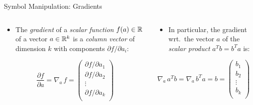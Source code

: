 \documentclass[mathserif, aspectratio=169]{beamer}
\begin{document}
\begin{frame}{Symbol Manipulation: Gradients}
	\begin{columns}[t]
		\begin{column}{0.5\textwidth}
			\begin{itemize}
				\item The \emph{gradient} of a \emph{scalar function} $f(a) \in \mathbb{R}$ of a vector $a \in \mathbb{R}^k$ is
					a \emph{column vector} of dimension $k$ with components ${\partial f}/{\partial a_i}$: 
			\end{itemize}
			\vspace{-5mm}
			\begin{center}
				\[ 
					\frac{\partial f}{\partial a} = \nabla_a\, f =
					\begin{pmatrix}
						{\partial f}/{\partial a_1} \\ 
						{\partial f}/{\partial a_2} \\
						\vdots \\
						{\partial f}/{\partial a_k} \\ 
					\end{pmatrix}
				\]
			\end{center}
		\end{column}
		\begin{column}{0.5\textwidth}
			\begin{itemize}
				\item In particular, the gradient wrt.\ the vector $a$ of the \emph{scalar product} $a^T b = b^T a$ is:
			\end{itemize}
			\begin{center}
				\[ 
					\nabla_a\, a^T b = \nabla_a\, b^T a = b =
					\begin{pmatrix}
						b_1 \\ b_2 \\ \vdots \\ b_k \\
					\end{pmatrix}
				\]
			\end{center}
		\end{column}
	\end{columns}
\end{frame}
\end{document}
